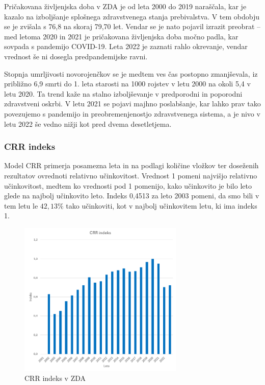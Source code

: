 \documentclass[12pt,a4paper]{article}
\theoremstyle{definition}
\begin{document}
Pričakovana življenjska doba v ZDA je od leta 2000 do 2019 naraščala, 
kar je kazalo na izboljšanje splošnega zdravstvenega stanja prebivalstva. 
V tem obdobju se je zvišala s 76,8 na skoraj 79,70 let. 
Vendar se je nato pojavil izrazit preobrat – med letoma 2020 in 2021 je pričakovana življenjska doba močno padla, 
kar sovpada s pandemijo COVID-19. Leta 2022 je zaznati rahlo okrevanje, vendar vrednost še ni dosegla predpandemijske ravni.

Stopnja umrljivosti novorojenčkov se je medtem ves čas postopno zmanjševala, iz približno 6,9 smrti do 1. leta starosti na 
1000 rojstev v letu 2000 na okoli 5,4 v letu 2020. 
Ta trend kaže na stalno izboljševanje v predporodni in poporodni zdravstveni oskrbi. 
V letu 2021 se pojavi majhno poslabšanje, 
kar lahko prav tako povezujemo s pandemijo in preobremenjenostjo zdravstvenega sistema, 
a je nivo v letu 2022 še vedno nižji kot pred dvema desetletjema.

\subsubsection{CRR indeks}
Model CRR primerja posamezna leta in na podlagi količine vložkov ter doseženih rezultatov ovrednoti relativno učinkovitost. 
Vrednost 1 pomeni najvišjo relativno učinkovitost, medtem ko vrednosti pod 1 pomenijo, 
kako učinkovito je bilo leto glede na najbolj učinkovito leto. Indeks 0,4513 za leto 2003 pomeni, 
da smo bili v tem letu le $42,13\%$ tako učinkoviti, kot v najbolj učinkovitem letu, ki ima indeks 1.

\begin{figure}[htbp]
    \centering
    \includegraphics[width=0.7\textwidth]{zda_CRR_indeks.png}
    \caption{CRR indeks v ZDA}
    \label{fig:zda_CRR_indeks}
\end{figure}
\end{document}
